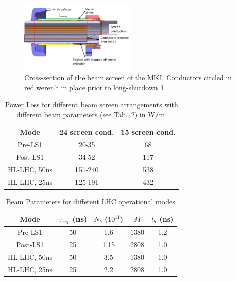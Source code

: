 \documentclass[a4paper,
              ]{jacow}
\begin{document}
\begin{figure}
\begin{center}
\includegraphics[width=0.5\textwidth]{beamScreenCrossSectionLabelled.pdf}
\caption{Cross-section of the beam screen of the MKI. Conductors circled in red weren't in place prior to long-shutdown 1}
\label{fig:BeamScreenPostLS1}
\end{center}
\end{figure}

\begin{table}
\caption{Power Loss for different beam screen arrangements with different beam parameters (see Tab.~\ref{tab:beamPara}) in W/m.}
\label{tab:PowLoss}
\begin{center}
\begin{tabular}{c | c | c}
Mode & 24 screen cond. & 15 screen cond. \\ \hline 
Pre-LS1 & 20-35 & 68 \\ \hline 
Post-LS1 & 34-52 & 117 \\ \hline 
HL-LHC, 50ns & 151-240 & 538  \\ \hline 
HL-LHC, 25ns & 125-191 & 432  \\ 
\end{tabular}
\end{center}
\end{table}

\begin{table}
\caption{Beam Parameters for different LHC operational modes}
\label{tab:beamPara}
\begin{center}
\begin{tabular}{c | c | c | c | c}
Mode & $\tau_{sep}$ (ns) & $N_{b}$ ($10^{11}$) & $ M $ & $t_{b}$ (ns) \\ \hline 
Pre-LS1 & 50 & 1.6 & $ 1380 $ & 1.2 \\ \hline 
Post-LS1 & 25 & 1.15 & 2808 & 1.0 \\ \hline 
HL-LHC, 50ns & 50 & 3.5 & 1380 & 1.0 \\ \hline 
HL-LHC, 25ns & 25 & 2.2 & 2808 & 1.0 \\ 
\end{tabular}
\end{center}
\end{table}
\end{document}
